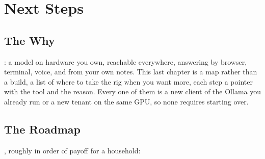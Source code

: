 
\chapter{Next Steps}
\vspace{1.5em}


\section{The Why}

: a model on hardware you own, reachable
everywhere, answering by browser, terminal, voice, and from your own notes. This
last chapter is a map rather than a build, a list of where to take the rig when you
want more, each step a pointer with the tool and the reason. Every one of them is a
new client of the Ollama you already run or a new tenant on the same GPU, so none requires
starting over.


\section{The Roadmap}

, roughly in order of payoff for a
household:

